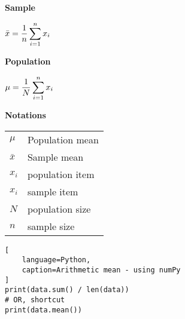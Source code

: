\begin{table}[H]
\begin{minipage}[t]{0.25\linewidth}

\textbf{Sample} \cite{statistics/book/Statistics-for-Data-Scientists/Maurits-Kaptein} \label{Data/Describing Data/Central Tendency/(Arithmetic) mean or average/Sample}

\vspace{0.3cm}

$
    \bar{x} = \dfrac{1}{n} \displaystyle\sum_{i=1}^{n} x_i
$

\end{minipage}
\hspace{0.3cm}
\vrule width 1pt
\hspace{0.3cm}
\begin{minipage}[t]{0.25\linewidth}

\textbf{Population} \cite{statistics/book/Statistics-for-Data-Scientists/Maurits-Kaptein} \label{Data/Describing Data/Central Tendency/(Arithmetic) mean or average/Population}

\vspace{0.3cm}

$
    \mu = \dfrac{1}{N} \displaystyle\sum_{i=1}^{n} x_i
$

\end{minipage}
\hspace{0.3cm}
\vrule width 1pt
\hspace{0.3cm}
\begin{minipage}[t]{0.25\linewidth}

{\hfill\textbf{Notations}\hfill}

\begin{table}[H]
    \begin{tabular}{l l}
        $\mu$ & Population mean \\
        $\bar{x}$ & Sample mean \\
        $x_i$ & population item \\
        $x_i$ & sample item \\
        $N$ & population size \\
        $n$ & sample size \\
    \end{tabular}
\end{table}


\end{minipage}
\end{table}






\begin{lstlisting}[
    language=Python,
    caption=Arithmetic mean - using numPy
]
print(data.sum() / len(data))
# OR, shortcut
print(data.mean())
\end{lstlisting}



